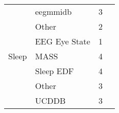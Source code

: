 \begin{tabular}{llrl}
      & eegmmidb &            3 &                                                                                          \cite{Zhang2018a, Zhang2017e, Zhang2017c} \\
      & Other &            2 &                                                                                                  \cite{VanPutten2018b, Zhang2018a} \\
      & EEG Eye State &            1 &                                                                                                                    \cite{Lee2018a} \\
Sleep & MASS &            4 &                                                                          \cite{Phan2018, Chambon2018, Supratak2017, dong2018mixed} \\
      & Sleep EDF &            4 &                                                                          \cite{Vilamala2017, Supratak2017, Xie2017, Tsinalis2016a} \\
      & Other &            3 &                                                                                            \cite{Sors2018, Tripathy2018, Giri2016} \\
      & UCDDB &            3 &                                                                                  \cite{Langkvist2018, Manzano2017a, Langkvist2012} \\
\bottomrule
\end{tabular}
